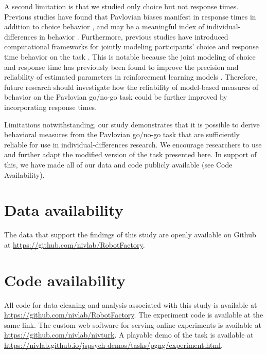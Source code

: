 \documentclass[a4paper,12pt]{article}
\begin{document}
\begin{refsection}[main]
A second limitation is that we studied only choice but not response times. Previous studies have found that Pavlovian biases manifest in response times in addition to choice behavior \cite{millner2018pavlovian, algermissen2022striatal}, and may be a meaningful index of individual-differences in behavior \cite{betts2020learning, millner2019suicidal, scholz2020dissociable}. Furthermore, previous studies have introduced computational frameworks for jointly modeling participants' choice and response time behavior on the task \cite{millner2018pavlovian, millner2019suicidal}. This is notable because the joint modeling of choice and response time has previously been found to improve the precision and reliability of estimated parameters in reinforcement learning models \cite{ballard2019joint, shahar2019improving}. Therefore, future research should investigate how the reliability of model-based measures of behavior on the Pavlovian go/no-go task could be further improved by incorporating response times. 

Limitations notwithstanding, our study demonstrates that it is possible to derive behavioral measures from the Pavlovian go/no-go task that are sufficiently reliable for use in individual-differences research. We encourage researchers to use and further adapt the modified version of the task presented here. In support of this, we have made all of our data and code publicly available (see Code Availability).

\break
\section*{Data availability}

The data that support the findings of this study are openly available on Github at \url{https://github.com/nivlab/RobotFactory}.

\section*{Code availability}

All code for data cleaning and analysis associated with this study is available at \url{https://github.com/nivlab/RobotFactory}. The experiment code is available at the same link.  The custom web-software for serving online experiments is available at \url{https://github.com/nivlab/nivturk}. A playable demo of the task is available at \url{https://nivlab.github.io/jspsych-demos/tasks/pgng/experiment.html}.


\end{refsection}
\end{document}

